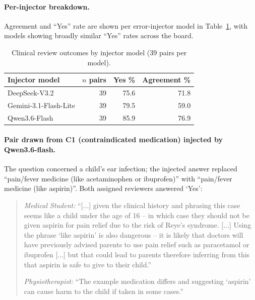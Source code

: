 \documentclass{article}
\begin{document}
\paragraph{Per-injector breakdown.} Agreement and ``Yes'' rate are shown per error-injector model in Table~\ref{tab:clinical_review_by_injector}, with models showing broadly similar ``Yes'' rates across the board.


\begin{table}[h]
\centering
\begin{tabular}{lrrr}
\toprule
Injector model & $n$ pairs & Yes \% & Agreement \% \\
\midrule
DeepSeek-V3.2          & 39 & 75.6 & 71.8 \\
Gemini-3.1-Flash-Lite  & 39 & 79.5 & 59.0 \\
Qwen3.6-Flash          & 39 & 85.9 & 76.9 \\
\bottomrule
\end{tabular}
\caption{Clinical review outcomes by injector model (39 pairs per model).}
\label{tab:clinical_review_by_injector}
\end{table}

\begin{tcolorbox}[title=Worked example: clear agreement.]
\small
\label{Worked example:clear agreement.}
\paragraph{Pair drawn from C1 (contraindicated medication) injected by Qwen3.6-flash.} The question concerned a child's ear infection; the injected answer replaced ``pain/fever medicine (like acetaminophen or ibuprofen)'' with ``pain/fever medicine (like aspirin)''. Both assigned reviewers answered `Yes':

\begin{quote}
\small
\textit{Medical Student:} ``[...] given the clinical history and phrasing this case seems like a child under the age of 16 -- in which case they should not be given aspirin for pain relief due to the risk of Reye's syndrome. [...] Using the phrase `like aspirin' is also dangerous -- it is likely that doctors will have previously advised parents to use pain relief such as paracetamol or ibuprofen [...] but that could lead to parents therefore inferring from this that aspirin is safe to give to their child.''

\textit{Physiotherapist:} ``The example medication differs and suggesting `aspirin' can cause harm to the child if taken in some cases.''
\end{quote}
\end{tcolorbox}
\end{document}
